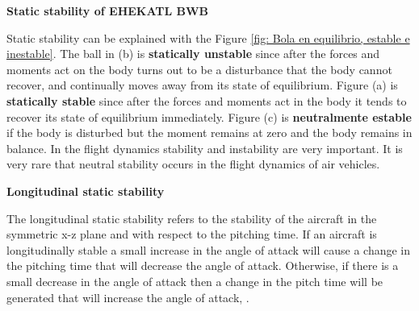 \medskip
\textbf{Static stability of EHEKATL BWB}

Static stability can be explained with the Figure \ref{fig: Bola en equilibrio, estable e inestable}. The ball in (b) is \textbf{statically unstable} since after the forces and moments act on the body turns out to be a disturbance that the body cannot recover, and continually moves away from its state of equilibrium. Figure (a) is \textbf{statically stable} since after the forces and moments act in the body it tends to recover its state of equilibrium immediately. Figure (c) is \textbf{neutralmente estable} if the body is disturbed but the moment remains at zero and the body remains in balance. 
%
In the flight dynamics stability and instability are very important. It is very rare that neutral stability occurs in the flight dynamics of air vehicles. 

\medskip

\textbf{Longitudinal static stability}

The longitudinal static stability refers to the stability of the aircraft in the symmetric x-z plane and with respect to the pitching time. If an aircraft is longitudinally stable a small increase in the angle of attack will cause a change in the pitching time that will decrease the angle of attack. Otherwise, if there is a small decrease in the angle of attack then a change in the pitch time will be generated that will increase the angle of attack, \cite{Neubacher2008}.

